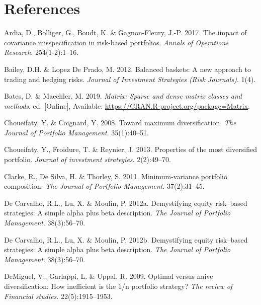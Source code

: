 \documentclass[11pt,preprint, authoryear]{elsarticle}
\numberwithin{equation}{section}
\numberwithin{figure}{section}
\numberwithin{table}{section}
\begin{document}
\newpage

\hypertarget{references}{%
\section*{References}\label{references}}

\hypertarget{refs}{}
\leavevmode\hypertarget{ref-ardia2017}{}%
Ardia, D., Bolliger, G., Boudt, K. \& Gagnon-Fleury, J.-P. 2017. The
impact of covariance misspecification in risk-based portfolios.
\emph{Annals of Operations Research}. 254(1-2):1--16.

\leavevmode\hypertarget{ref-lopez2012}{}%
Bailey, D.H. \& Lopez De Prado, M. 2012. Balanced baskets: A new
approach to trading and hedging risks. \emph{Journal of Investment
Strategies (Risk Journals)}. 1(4).

\leavevmode\hypertarget{ref-Matrix}{}%
Bates, D. \& Maechler, M. 2019. \emph{Matrix: Sparse and dense matrix
classes and methods}. ed. {[}Online{]}, Available:
\url{https://CRAN.R-project.org/package=Matrix}.

\leavevmode\hypertarget{ref-choueifaty2008}{}%
Choueifaty, Y. \& Coignard, Y. 2008. Toward maximum diversification.
\emph{The Journal of Portfolio Management}. 35(1):40--51.

\leavevmode\hypertarget{ref-choueifaty2013}{}%
Choueifaty, Y., Froidure, T. \& Reynier, J. 2013. Properties of the most
diversified portfolio. \emph{Journal of investment strategies}.
2(2):49--70.

\leavevmode\hypertarget{ref-clarke2011}{}%
Clarke, R., De Silva, H. \& Thorley, S. 2011. Minimum-variance portfolio
composition. \emph{The Journal of Portfolio Management}. 37(2):31--45.

\leavevmode\hypertarget{ref-leote}{}%
De Carvalho, R.L., Lu, X. \& Moulin, P. 2012a. Demystifying equity
risk--based strategies: A simple alpha plus beta description. \emph{The
Journal of Portfolio Management}. 38(3):56--70.

\leavevmode\hypertarget{ref-rawl2012}{}%
De Carvalho, R.L., Lu, X. \& Moulin, P. 2012b. Demystifying equity
risk--based strategies: A simple alpha plus beta description. \emph{The
Journal of Portfolio Management}. 38(3):56--70.

\leavevmode\hypertarget{ref-demiguel2009}{}%
DeMiguel, V., Garlappi, L. \& Uppal, R. 2009. Optimal versus naive
diversification: How inefficient is the 1/n portfolio strategy?
\emph{The review of Financial studies}. 22(5):1915--1953.
\end{document}

